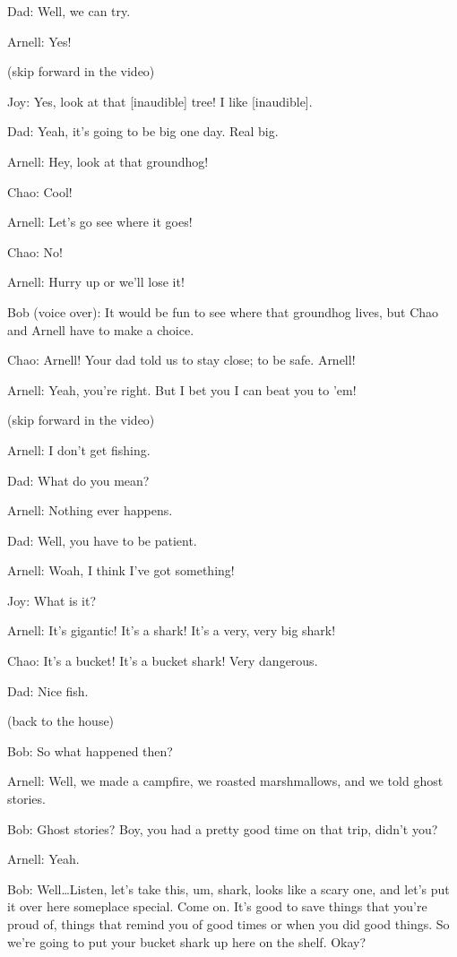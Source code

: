 Dad: Well, we can try.

Arnell: Yes!

(skip forward in the video)

Joy: Yes, look at that [inaudible] tree! I like [inaudible].

Dad: Yeah, it's going to be big one day. Real big.

Arnell: Hey, look at that groundhog!

Chao: Cool!

Arnell: Let's go see where it goes!

Chao: No!

Arnell: Hurry up or we'll lose it!

Bob (voice over): It would be fun to see where that groundhog lives, but Chao and Arnell have to make a choice.

Chao: Arnell! Your dad told us to stay close; to be safe. Arnell!

Arnell: Yeah, you're right. But I bet you I can beat you to 'em!

(skip forward in the video)

Arnell: I don't get fishing.

Dad: What do you mean?

Arnell: Nothing ever happens.

Dad: Well, you have to be patient.

Arnell: Woah, I think I've got something!

Joy: What is it?

Arnell: It's gigantic! It's a shark! It's a very, very big shark!

Chao: It's a bucket! It's a bucket shark! Very dangerous.

Dad: Nice fish.

(back to the house)

Bob: So what happened then?

Arnell: Well, we made a campfire, we roasted marshmallows, and we told ghost stories.

Bob: Ghost stories? Boy, you had a pretty good time on that trip, didn't you?

Arnell: Yeah.

Bob: Well\dots Listen, let's take this, um, shark, looks like a scary one, and let's put it over here someplace special. Come on. It's good to save things that you're proud of, things that remind you of good times or when you did good things. So we're going to put your bucket shark up here on the shelf. Okay?

